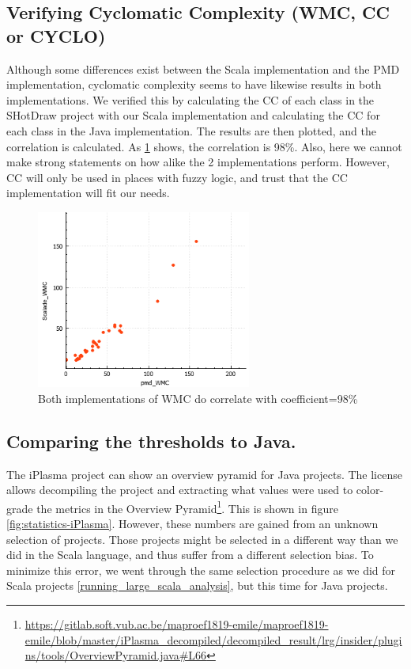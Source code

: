 \documentclass[onecolumn]{article}
\begin{document}
\subsection{Verifying Cyclomatic Complexity (WMC, CC or CYCLO)}
Although some differences exist between the Scala implementation and the PMD implementation, cyclomatic complexity seems to have likewise results in both implementations. We verified this by calculating the CC of each class in the SHotDraw project with our Scala implementation and calculating the CC for each class in the Java implementation. The results are then plotted, and the correlation is calculated. As \ref{fig:good_WMC_correlation} shows, the correlation is 98\%. Also, here we cannot make strong statements on how alike the 2 implementations perform. However, CC will only be used in places with fuzzy logic, and trust that the CC implementation will fit our needs.
\begin{figure}[H]
    \centering
    \includegraphics[width=200pt]{fig/good_WMC_correlation.PNG}
    \caption{Both implementations of WMC do correlate with coefficient=98\%}
    \label{fig:good_WMC_correlation}
\end{figure}


\subsection{Comparing the thresholds to Java.} \label{comparing_tresholds}
The iPlasma project can show an overview pyramid for Java projects. The license allows decompiling the project and extracting what values were used to color-grade the metrics in the Overview Pyramid\footnote{\url{https://gitlab.soft.vub.ac.be/maproef1819-emile/maproef1819-emile/blob/master/iPlasma_decompiled/decompiled_result/lrg/insider/plugins/tools/OverviewPyramid.java\#L66}}. This is shown in figure \ref{fig:statistics-iPlasma}. However, these numbers are gained from an unknown selection of projects. Those projects might be selected in a different way than we did in the Scala language, and thus suffer from a different selection bias. To minimize this error, we went through the same selection procedure as we did for Scala projects \ref{running_large_scala_analysis}, but this time for Java projects.
\end{document}
